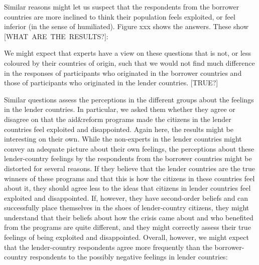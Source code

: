 Similar reasons might let us suspect that the respondents from the borrower
countries are more inclined to think their population feels exploited, or
feel inferior (in the sense of humiliated). Figure xxx shows the answers.
These show [WHAT\ ARE\ THE\ RESULTS?]:


We might expect that experts have a view on these questions that is not, or
less coloured by their countries of origin, such that we would not find much
difference in the responses of participants who originated in the borrower
countries and those of participants who originated in the lender countries.
[TRUE?]

Similar questions assess the perceptions in the different groups about the
feelings in the lender countries. In particular, we asked them whether they
agree or disagree on that the aid\&reform programs made the citizens in the
lender countries feel exploited and disappointed. Again here, the results
might be interesting on their own. While the non-experts in the lender
countries might convey an adequate picture about their own feelings, the
perceptions about these lender-country feelings by the respondents from the
borrower countries might be distorted for several reasons. If they believe
that the lender countries are the true winners of these programs and that
this is how the citizens in these countries feel about it, they should agree
less to the ideas that citizens in lender countries feel exploited and
disappointed. If, however, they have second-order beliefs and can
successfully place themselves in the shoes of lender-country citizens, they
might understand that their beliefs about how the crisis came about and who
benefited from the programs are quite different, and they might correctly
assess their true feelings of being exploited and disappointed. Overall,
however, we might expect that the lender-country respondents agree more
frequently than the borrower-country respondents to the possibly negative
feelings in lender countries:


